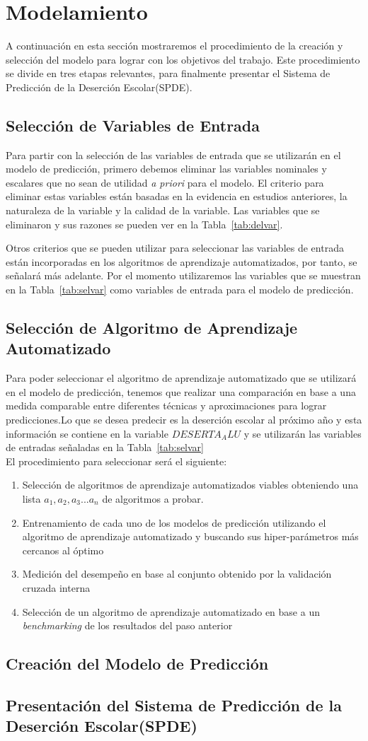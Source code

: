 \section{Modelamiento}
A continuación en esta sección mostraremos el procedimiento de la creación y selección del modelo para lograr con los objetivos del trabajo.
Este procedimiento se divide en tres etapas relevantes, para finalmente presentar el Sistema de Predicción de la Deserción Escolar(SPDE).
\subsection{Selección de Variables de Entrada}
Para partir con la selección de las variables de entrada que se utilizarán en el modelo de predicción, primero debemos eliminar las variables nominales y escalares que no sean de utilidad \textit{a priori} para el modelo.
El criterio para eliminar estas variables están basadas en la evidencia en estudios anteriores, la naturaleza de la variable y la calidad de la variable. Las variables que se eliminaron y sus razones se pueden ver en la Tabla~\ref{tab:delvar}.

Otros criterios que se pueden utilizar para seleccionar las variables de entrada están incorporadas en los algoritmos de aprendizaje automatizados, por tanto, se señalará más adelante. Por el momento utilizaremos las variables que se muestran en la Tabla~\ref{tab:selvar} como variables de entrada para el modelo de predicción.

\subsection{Selección de Algoritmo de Aprendizaje Automatizado}
Para poder seleccionar el algoritmo de aprendizaje automatizado que se utilizará en el modelo de predicción, tenemos que realizar una comparación en base a una medida comparable entre diferentes técnicas y aproximaciones para lograr predicciones.Lo que se desea predecir es la deserción escolar al próximo año y esta información se contiene en la variable $DESERTA_ALU$ y se utilizarán las variables de entradas señaladas en la Tabla~\ref{tab:selvar}
\\El procedimiento para seleccionar será el siguiente:
\begin{enumerate}
\item Selección de algoritmos de aprendizaje automatizados viables obteniendo una lista $a_1,a_2,a_3 ... a_n$ de algoritmos a probar.
\item Entrenamiento de cada uno de los modelos de predicción utilizando el algoritmo de aprendizaje automatizado y buscando sus hiper-parámetros más cercanos al óptimo
\item Medición del desempeño en base al conjunto obtenido por la validación cruzada interna
\item Selección de un algoritmo de aprendizaje automatizado en base a un \textit{benchmarking} de los resultados del paso anterior
\end{enumerate}
\subsection{Creación del Modelo de Predicción}
\subsection{Presentación del Sistema de Predicción de la Deserción Escolar(SPDE)}